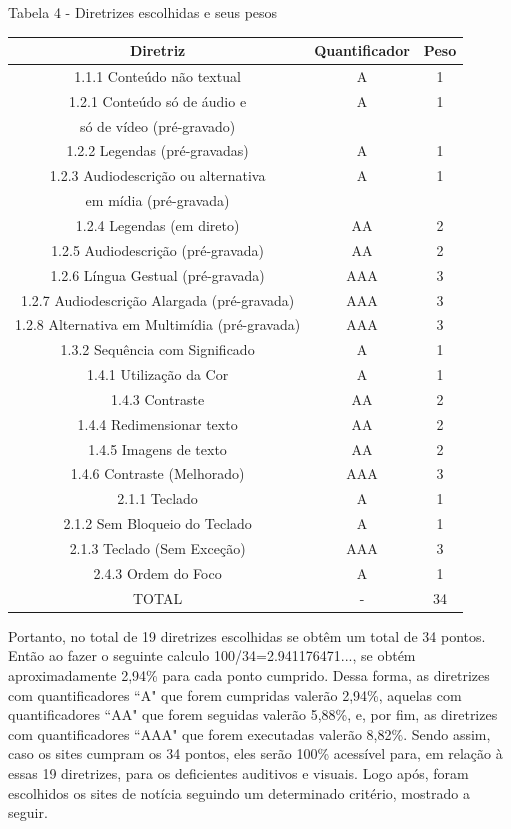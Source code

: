 \documentclass[a4paper]{article}
\begin{document}
\begin{titlepage}
Tabela 4 - Diretrizes escolhidas e seus pesos\\[-1cm]
\begin{center}
	\begin{longtable}{|c|c|c|}
		\hline
		Diretriz & Quantificador & Peso\\
		\hline
		1.1.1 Conteúdo não textual & A & 1\\
		\hline
		1.2.1 Conteúdo só de áudio e & A & 1\\
		só de vídeo (pré-gravado) & & \\
		\hline
		1.2.2 Legendas (pré-gravadas) & A & 1\\
		\hline
		1.2.3 Audiodescrição ou alternativa & A & 1\\
		em mídia (pré-gravada) & & \\
		\hline
		1.2.4 Legendas (em direto) & AA & 2\\
		\hline
		1.2.5 Audiodescrição (pré-gravada) & AA & 2\\
		\hline
		1.2.6 Língua Gestual (pré-gravada) & AAA & 3\\
		\hline
		1.2.7 Audiodescrição Alargada (pré-gravada) & AAA & 3\\
		\hline
		1.2.8 Alternativa em Multimídia (pré-gravada) & AAA & 3\\
		\hline
		1.3.2 Sequência com Significado & A & 1\\
		\hline
		1.4.1 Utilização da Cor & A & 1\\
		\hline
		1.4.3 Contraste & AA & 2\\
		\hline
		1.4.4 Redimensionar texto & AA & 2\\
		\hline
		1.4.5 Imagens de texto & AA & 2\\
		\hline
		1.4.6 Contraste (Melhorado) & AAA & 3\\
		\hline
		2.1.1 Teclado & A & 1\\
		\hline
		2.1.2 Sem Bloqueio do Teclado & A & 1\\
		\hline
		2.1.3 Teclado (Sem Exceção) & AAA & 3\\
		\hline
		2.4.3 Ordem do Foco & A & 1\\
		\hline
		TOTAL & - & 34\\
		\hline
	\end{longtable}
\end{center}

Portanto, no total de 19 diretrizes escolhidas se obtêm um total de 34 pontos. Então ao fazer o seguinte calculo 100/34=2.941176471..., se obtém aproximadamente 2,94\% para cada ponto cumprido. Dessa forma, as diretrizes com quantificadores ``A" que forem cumpridas valerão 2,94\%, aquelas com quantificadores ``AA" que forem seguidas valerão 5,88\%, e, por fim, as diretrizes com quantificadores ``AAA" que forem executadas valerão 8,82\%. Sendo assim, caso os sites cumpram os 34 pontos, eles serão 100\% acessível para, em relação à essas 19 diretrizes, para os deficientes auditivos e visuais. Logo após, foram escolhidos os sites de notícia seguindo um determinado critério, mostrado a seguir.


\end{titlepage}
\end{document}
